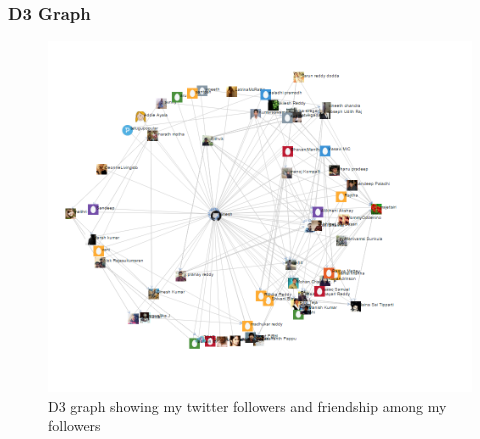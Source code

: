 \subsubsection{D3 Graph}
\begin{figure}[ht]    
    \begin{center}
        \includegraphics[scale=0.8]{q1.png}
        \caption{D3 graph showing my twitter followers and friendship among my followers}
        \label{graph1}
    \end{center}
\end{figure}
\newpage